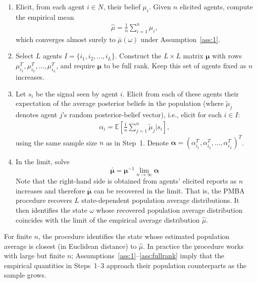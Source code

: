 \documentclass[12pt,reqno]{amsart}
\newcommand{\tmu}{\tilde{\mu}}
\begin{document}
\begin{framedbox}[htbp]
  \caption{Population-Mean-Based Aggregation}\label{proc:pmba2}
  \begin{minipage}{0.95\textwidth}
\begin{enumerate}
    \item Elicit, from each agent $i \in N$, their belief $\mu_i$. Given $n$ elicited agents, compute the empirical mean
    \begin{align*}
        \hat{\mu} = \frac1n \sum_{i=1}^n \mu_i,
    \end{align*}
    which converges almost surely to $\bar{\mu}(\omega)$ under Assumption~\ref{ass:1}.
    \item Select $L$ agents $I = \{i_1, i_2, \ldots, i_L \}$. Construct the $L\times L$ matrix $\bm{\mu}$ with rows $\mu_{i_1}^T,\mu_{i_2}^T,\ldots,\mu_{i_L}^T$, and require $\bm{\mu}$ to be full rank. Keep this set of agents fixed as $n$ increases.
    \item Let $s_i$ be the signal seen by agent $i$. Elicit from each of these agents their expectation of the average posterior beliefs in the population (where $\tmu_j$ denotes agent $j$'s random posterior-belief vector), i.e., elicit for each $i \in I$:
    \begin{align*}
        \alpha_i = \mathbb{E}\left[\frac1n \sum_{j= 1}^n \tmu_j \bigg| s_i\right],
    \end{align*}
    using the same sample size $n$ as in Step~1.
    Denote $\bm{\alpha}= (\alpha_{i_1}^T, \alpha_{i_2}^T, \ldots, \alpha_{i_L}^T)^T$.
\item In the limit, solve
    \begin{equation}
    \bar{\bm{\mu}} = \bm{\mu}^{-1} \lim_{n\to\infty}\bm{\alpha}\label{eqn:mainstep2}
    \end{equation}
    Note that the right-hand side is obtained from agents' elicited reports as $n$ increases and therefore $\bar{\bm \mu}$ can be recovered in the limit. That is, the PMBA procedure recovers $L$ state-dependent population average distributions. It then identifies the state $\omega$ whose recovered population average distribution coincides with the limit of the empirical average distribution $\hat{\mu}$.
\end{enumerate}   
For finite $n$, the procedure identifies the state whose estimated population average is closest (in Euclidean distance) to $\hat{\mu}$.
In practice the procedure works with large but finite $n$; Assumptions~\ref{ass:1}--\ref{ass:fullrank} imply that the empirical quantities in Steps~1--3 approach their population counterparts as the sample grows.
  \end{minipage}
\end{framedbox}
\end{document}

